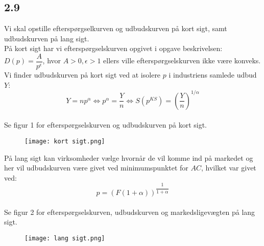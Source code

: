 \documentclass[a4paper, 12pt]{article}
\begin{document}
\subsection*{2.9}
Vi skal opstille efterspørgselkurven og udbudskurven på kort sigt, samt udbudskurven på lang sigt.
\\
På kort sigt har vi efterspørgselskurven opgivet i opgave beskrivelsen: $D(p)=\dfrac{A}{p^{\epsilon}}$, hvor $A > 0, \epsilon > 1$ ellers ville efterspørgselskurven ikke være konveks.
\\
Vi finder udbudskurven på kort sigt ved at isolere $p$ i industriens samlede udbud $Y$:
$$Y = np^{\alpha} \Leftrightarrow p^{\alpha} = \dfrac{Y}{n} \Leftrightarrow S(p^{KS}) = \left( \dfrac{Y}{n} \right)^{1 / \alpha}$$
\\
Se figur 1 for efterspørgselskurven og udbudskurven på kort sigt.\\
\FloatBarrier
\begin{center}
	\begin{figure}[!ht]	
		\centering	
\texttt{[image: kort sigt.png]}
		\caption{}
	\end{figure}
\end{center}
\FloatBarrier

På lang sigt kan virksomheder vælge hvornår de vil komme ind på markedet og her vil udbudskurven være givet ved minimumspunktet for $AC$, hvilket var givet ved:
$$p = (F(1+ \alpha))^{\dfrac{1}{1 + \alpha}}$$
\\
Se figur 2 for efterspørgselskurven, udbudskurven og markedsligevægten på lang sigt.
\FloatBarrier
\begin{center}
	\begin{figure}[!ht]	
		\centering	
\texttt{[image: lang sigt.png]}
		\caption{}
	\end{figure}
\end{center}
\FloatBarrier


\end{document}
